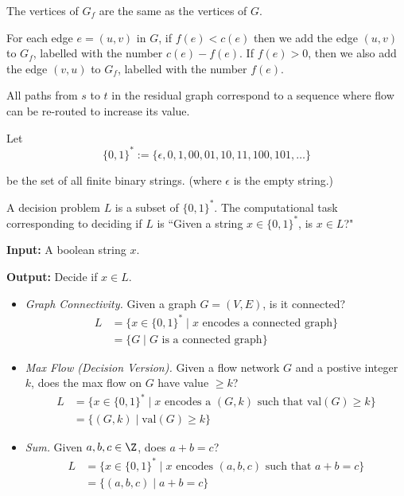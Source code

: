 The vertices of $G_f$ are the same as the vertices of $G$.

For each edge $e=(u,v)$ in $G$, if $f(e)<c(e)$ then we add the edge
$(u,v)$ to $G_f$, labelled with the number $c(e)-f(e)$. If $f(e)>0$,
then we also add the edge $(v,u)$ to $G_f$, labelled with the number
$f(e)$.

All paths from $s$ to $t$ in the residual graph correspond to a
sequence where flow can be re-routed to increase its value.

\def\binrep{\{0,1\}^*}

Let
$$\binrep:=\{\epsilon,0,1,00,01,10,11,100,101,\ldots\}$$

be the set of all finite binary strings. (where $\epsilon$ is the
empty string.)


A decision problem $L$ is a subset of $\binrep$. The computational
task corresponding to deciding if $L$ is ``Given a string
$x\in\binrep$, is $x\in L$?"


\textbf{Input:} A boolean string $x$.

\textbf{Output:} Decide if $x\in L$.


\begin{itemize}
	\def\B{\binrep}
	\item\textit{Graph Connectivity.} Given a graph $G=(V,E)$, is it
	      connected?
	      \begin{align*}
		      L & =\{x\in\B\mid x\text{ encodes a connected graph}\} \\
		        & =\{G \mid G \text{ is a connected graph}\}
	      \end{align*}
	\item\textit{Max Flow (Decision Version).} Given a flow network
	      $G$ and a postive integer $k$, does the max flow on $G$ have
	      value $\geq k$?
	      \begin{align*}
		      L & =\{x\in\B\mid x\text{ encodes a $(G,k)$ such that $\text{val}(G)\geq k$}\} \\
		        & =\{(G,k)\mid\text{val}(G)\geq k \}
	      \end{align*}
	\item\textit{Sum.} Given $a,b,c\in\Z$, does $a+b=c$?
	      \begin{align*}
		      L & =\{x\in\B\mid x\text{ encodes $(a,b,c)$ such that $a+b=c$}\} \\
		        & =\{(a,b,c)\mid a+b=c\}
	      \end{align*}
\end{itemize}

